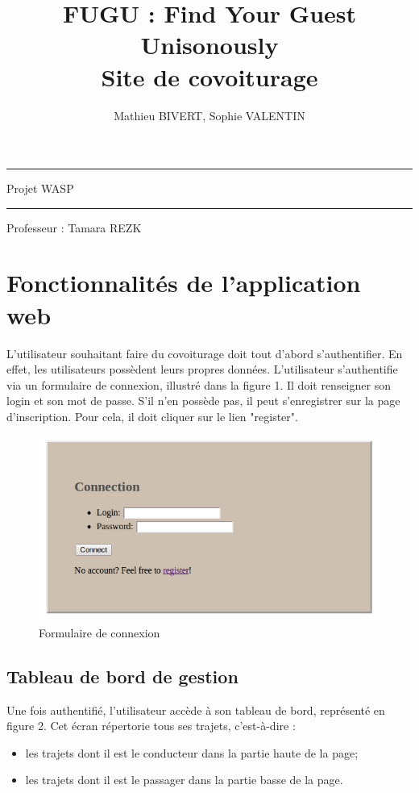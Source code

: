 \documentclass[a4paper]{article}
\title{FUGU : Find Your Guest Unisonously\\Site de covoiturage}
\author{Mathieu BIVERT, Sophie VALENTIN}
\makeatletter
\def\maketitle{%
  \null
  \thispagestyle{empty}%
  \vskip 1cm
  \begin{center}
        \normalfont\large\huge\@author
  \end{center}
  \vfil
  \vfil
  \vfil
  \vfil
  \vfil
  \vfil
  \vfil
  \vfil
  \vfil
  \vfil
  \vfil
  \vfil  
  \vfil  
  \hrule height 2pt
  \par
  \begin{center}
        \huge \strut Projet WASP\\
        \@title \par
  \end{center}
  \hrule height 2pt
  \par
  \vfil
  \vfil
  \vfil
  \vfil
  \vfil
  \vfil
  \vfil
  \vfil  
  \vfil
  \vfil
  \vfil
  \vfil  
  \vfil  
  \vfil
  \vfil  
  \vfil  
  \vfil
  \vfil
  \vfil
  \vfil
  \vfil
  \vfil
  \begin{center}
  			\huge Professeur : Tamara REZK
  \end{center}
  \null
\cleardoublepage
}
\makeatother
\begin{document}
\maketitle

\newpage

\section{Fonctionnalités de l'application web}

L'utilisateur souhaitant faire du covoiturage doit tout d'abord s'authentifier.
En effet, les utilisateurs possèdent leurs propres données.
L'utilisateur s'authentifie via un formulaire de connexion, illustré dans la figure 1.
Il doit renseigner son login et son mot de passe. S'il n'en possède pas,
il peut s'enregistrer sur la page d'inscription. Pour cela, il doit cliquer 
sur le lien "register".

\begin{figure}[!ht]
	\centering
	\includegraphics[scale=0.4]{Connexion.png}
	\caption{\label{login} Formulaire de connexion}
\end{figure}

\subsection{Tableau de bord de gestion}

Une fois authentifié, l'utilisateur accède à son tableau de bord, représenté en figure 2. Cet écran répertorie tous ses trajets, c'est-à-dire :
\begin{itemize}
	\item les trajets dont il est le conducteur dans la partie haute de la page;
	\item les trajets dont il est le passager dans la partie basse de la page.
\end{itemize}
\end{document}
